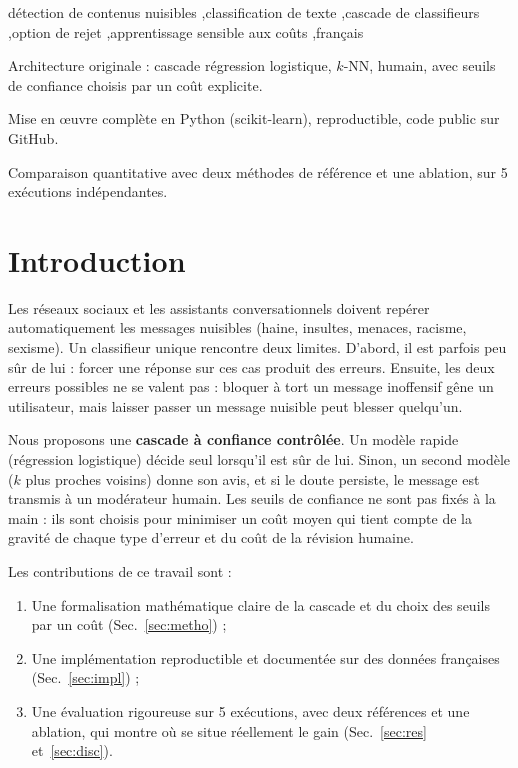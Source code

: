 \documentclass[a4paper,fleqn]{cas-sc}
\begin{document}
\begin{keywords}
détection de contenus nuisibles \sep classification de texte \sep cascade de classifieurs
\sep option de rejet \sep apprentissage sensible aux coûts \sep français
\end{keywords}

\begin{highlights}
\item Architecture originale : cascade régression logistique, $k$-NN, humain, avec seuils de confiance choisis par un coût explicite.
\item Mise en œuvre complète en Python (scikit-learn), reproductible, code public sur GitHub.
\item Comparaison quantitative avec deux méthodes de référence et une ablation, sur 5 exécutions indépendantes.
\end{highlights}

\maketitle

\section{Introduction}

Les réseaux sociaux et les assistants conversationnels doivent repérer automatiquement les messages
nuisibles (haine, insultes, menaces, racisme, sexisme). Un classifieur unique rencontre deux limites.
D'abord, il est parfois peu sûr de lui : forcer une réponse sur ces cas produit des erreurs.
Ensuite, les deux erreurs possibles ne se valent pas : bloquer à tort un message inoffensif gêne un
utilisateur, mais laisser passer un message nuisible peut blesser quelqu'un.

Nous proposons une \textbf{cascade à confiance contrôlée}. Un modèle rapide (régression logistique)
décide seul lorsqu'il est sûr de lui. Sinon, un second modèle ($k$ plus proches voisins) donne son
avis, et si le doute persiste, le message est transmis à un modérateur humain. Les seuils de confiance
ne sont pas fixés à la main : ils sont choisis pour minimiser un coût moyen qui tient compte de la
gravité de chaque type d'erreur et du coût de la révision humaine.

Les contributions de ce travail sont :
\begin{enumerate}
    \item Une formalisation mathématique claire de la cascade et du choix des seuils par un coût (Sec.~\ref{sec:metho}) ;
    \item Une implémentation reproductible et documentée sur des données françaises (Sec.~\ref{sec:impl}) ;
    \item Une évaluation rigoureuse sur 5 exécutions, avec deux références et une ablation, qui montre
    où se situe réellement le gain (Sec.~\ref{sec:res} et~\ref{sec:disc}).
\end{enumerate}
\end{document}
